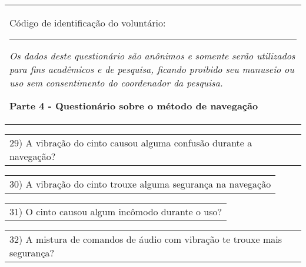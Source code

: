 \begin{table}[!thb]
    \begin{tabular}{m{1\linewidth}}

        {\color{gray}
        
        Código de identificação do voluntário: \rule{1in}{.2mm}
        
        \textit{Os dados deste questionário são anônimos e somente serão utilizados para fins acadêmicos e de pesquisa, ficando proibido seu manuseio ou uso sem consentimento do coordenador da pesquisa.}
        }
        
        \begin{center}
        \textbf{Parte 4 - Questionário sobre o método de navegação}
        \end{center}
        
    \end{tabular}
%

    \begin{tabular}{m{1\linewidth}}
        \vspace{1ex}
        29)	A vibração do cinto causou alguma confusão durante a navegação?
    \end{tabular}

    
    

    \begin{tabular}{m{1\linewidth}}
        \vspace{1ex}
        30)	A vibração do cinto trouxe alguma segurança na navegação
    \end{tabular}

    
    

    \begin{tabular}{m{1\linewidth}}
        \vspace{1ex}
        31)	O cinto causou algum incômodo durante o uso?
    \end{tabular}

    
    

    \begin{tabular}{m{1\linewidth}}
        \vspace{1ex}
        32)	A mistura de comandos de áudio com vibração te trouxe mais segurança?
    \end{tabular}


\end{table}
